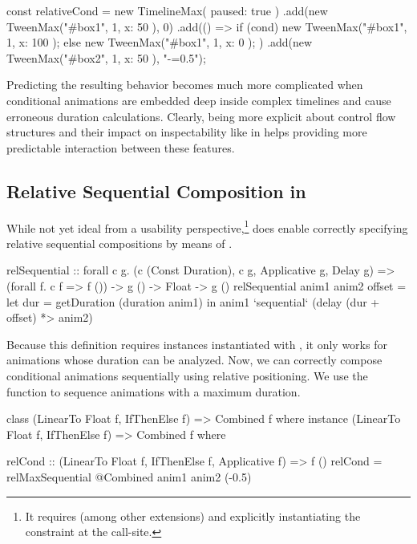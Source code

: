 \begin{js}
const relativeCond = new TimelineMax({ paused: true })
  .add(new TweenMax("#box1", 1, { x: 50 }), 0)
  .add(() => { if (cond) { new TweenMax("#box1", 1, { x: 100 });
               } else { new TweenMax("#box1", 1, { x: 0 }); } })
  .add(new TweenMax("#box2", 1, { x: 50 }), "-=0.5");
\end{js}

Predicting the resulting behavior becomes much more complicated when
conditional animations are embedded deep inside complex timelines and cause
erroneous duration calculations.  Clearly, being more explicit about control
flow structures and their impact on inspectability like in \dsl{} helps
providing more predictable interaction between these features.

\subsection{Relative Sequential Composition in \dsl{}}

While not yet ideal from a usability perspective,\footnote{It
requires
 (among other extensions) and explicitly instantiating the
constraint  at the call-site.
}
 \dsl{} does enable correctly
specifying relative sequential compositions by means of .
\begin{spec}
relSequential :: forall c g.
  (c (Const Duration), c g, Applicative g, Delay g) =>
  (forall f. c f => f ()) -> g () -> Float -> g ()
relSequential anim1 anim2 offset = let
  dur = getDuration (duration anim1)
  in anim1 `sequential` (delay (dur + offset) *> anim2)
\end{spec}

Because this definition requires instances instantiated with ,
it only works for animations whose duration can be analyzed. 
Now, we can correctly compose conditional animations sequentially using
relative positioning. We use the  function to sequence
animations with a maximum duration.

\begin{spec}
class (LinearTo Float f, IfThenElse f) => Combined f where
instance (LinearTo Float f, IfThenElse f) => Combined f where

relCond :: (LinearTo Float f, IfThenElse f, Applicative f) => f ()
relCond = relMaxSequential @Combined anim1 anim2 (-0.5)
\end{spec}


